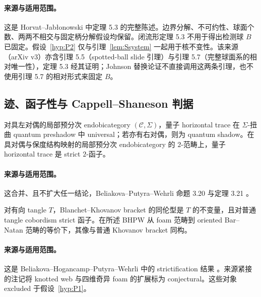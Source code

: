 \paragraph{来源与适用范围。}
这是 Horvat--Jab\l onowski \cite[Theorem~5.3]{HorvatJablonowski2025} 中定理 5.3 的完整陈述。边界分解、不可约性、球面个数、两两不相交与固定柄分解假设均保留。闭流形定理 5.3 不用于得出检测球 $B$ 已固定。假设~\ref{hyp:P2} 仅与引理~\ref{lem:Ssystem} 一起用于核不变性。该来源（arXiv v3）亦含引理 5.5（spotted-ball slide 引理）与引理 5.7（完整球面系的相对唯一性），定理 5.3 经其证明；Johnson 替换论证不直接调用这两条引理，也不使用引理 5.7 的相对形式来固定 $B$。

\subsection{迹、函子性与 Cappell--Shaneson 判据}

\begin{externalresult}\label{prop:bpw-trace}
对具左对偶的局部预分次 endobicategory $(\mathcal C,\Sigma)$，量子 horizontal trace 在 $\Sigma$-扭曲 quantum preshadow 中 universal；若亦有右对偶，则为 quantum shadow。在具对偶与保度结构映射的局部预分次 endobicategory 的 $2$-范畴上，量子 horizontal trace 是 strict $2$-函子。
\end{externalresult}

\paragraph{来源与适用范围。}
这合并、且不扩大任一结论，Beliakova--Putyra--Wehrli 命题 3.20 与定理 3.21 \cite[Proposition~3.20 and Theorem~3.21]{BeliakovaPutyraWehrli2019}。

\begin{externalresult}[BHPW 定理 4.6]\label{prop:bhpw}
对有向 tangle $T$，Blanchet--Khovanov bracket 的同伦型是 $T$ 的不变量，且对普通 tangle cobordism strict 函子。在所述 BHPW 从 foam 范畴到 oriented Bar--Natan 范畴的等价下，其像与普通 Khovanov bracket 同构。
\end{externalresult}

\paragraph{来源与适用范围。}
这是 Beliakova--Hogancamp--Putyra--Wehrli 中的 strictification 结果 \cite[Theorem~4.6]{BeliakovaHogancampPutyraWehrli2023}。来源紧接的注记将 knotted web 与四维奇异 foam 的扩展标为 conjectural。这些对象 excluded 于假设~\ref{hyp:P1}。

